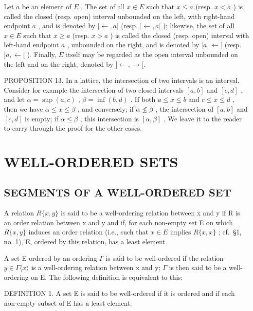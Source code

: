 Let \(a\) be an element of \(E\) . The set of all \(x \in E\) such that \(x \leqslant a\) (resp. \(x < a\) ) is called the closed (resp. open) interval unbounded on the left, with right-hand endpoint \(a\) , and is denoted by \(] \leftarrow, a]\) (resp. \(] \leftarrow, a[\) ); likewise, the set of all \(x \in E\) such that \(x \geqslant a\) (resp. \(x > a\) ) is called the closed (resp. open) interval with left-hand endpoint \(a\) , unbounded on the right, and is denoted by \([a, \leftarrow[\) (resp. \(]a, \leftarrow[\) ). Finally, \(E\) itself may be regarded as the open interval unbounded on the left and on the right, denoted by \(] \leftarrow, \rightarrow [.\)

PROPOSITION 13. In a lattice, the intersection of two intervals is an interval. Consider for example the intersection of two closed intervals \([a, b]\) and \([c, d]\) , and let \(\alpha = \sup (a, c)\) , \(\beta = \inf (b, d)\) . If both \(a \leqslant x \leqslant b\) and \(c \leqslant x \leqslant d\) , then we have \(\alpha \leqslant x \leqslant \beta\) , and conversely; if \(\alpha \not\leqslant \beta\) , the intersection of \([a, b]\) and \([c, d]\) is empty; if \(\alpha \leqslant \beta\) , this intersection is \([\alpha, \beta]\) . We leave it to the reader to carry through the proof for the other cases.

\section{WELL-ORDERED SETS}

\subsection{SEGMENTS OF A WELL-ORDERED SET}

A relation \(R\{x, y\}\) is said to be a well-ordering relation between x and y if R is an order relation between x and y and if, for each non-empty set E on which \(R\{x, y\}\) induces an order relation (i.e., such that \(x \in E\) implies \(R\{x, x\}\) ; cf.~§1, no. 1), E, ordered by this relation, has a least element.

A set E ordered by an ordering \(\Gamma\) is said to be well-ordered if the relation \(y \in \Gamma\langle x \rangle\) is a well-ordering relation between x and y; \(\Gamma\) is then said to be a well-ordering on E. The following definition is equivalent to this:

DEFINITION 1. A set E is said to be well-ordered if it is ordered and if each non-empty subset of E has a least element.

